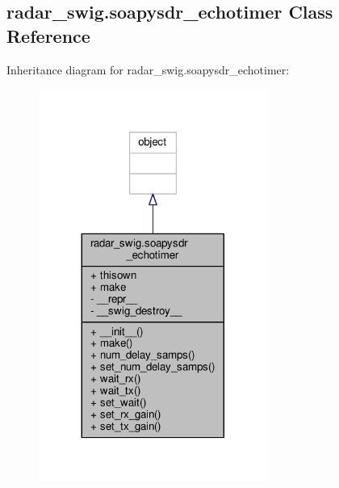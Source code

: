 \subsection{radar\+\_\+swig.\+soapysdr\+\_\+echotimer Class Reference}
\label{classradar__swig_1_1soapysdr__echotimer}


Inheritance diagram for radar\+\_\+swig.\+soapysdr\+\_\+echotimer\+:
\nopagebreak
\begin{figure}[H]
\begin{center}
\leavevmode
\includegraphics[width=212pt]{d7/db6/classradar__swig_1_1soapysdr__echotimer__inherit__graph}
\end{center}
\end{figure}


